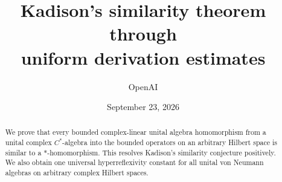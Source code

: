 \documentclass[11pt]{article}
\title{Kadison's similarity theorem through\\uniform derivation estimates}
\author{OpenAI}
\date{September 23, 2026}
\begin{document}
\maketitle
\begin{abstract}
We prove that every bounded complex-linear unital algebra homomorphism from a unital
complex $C^*$-algebra into the bounded operators on an arbitrary Hilbert
space is similar to a $*$-homomorphism. This resolves Kadison's similarity
conjecture positively. We also obtain one universal hyperreflexivity constant
for all unital von Neumann algebras on arbitrary complex Hilbert spaces.
\end{abstract}







\begingroup
\raggedright
\setlength{\bibsep}{5pt}


\endgroup
\end{document}
